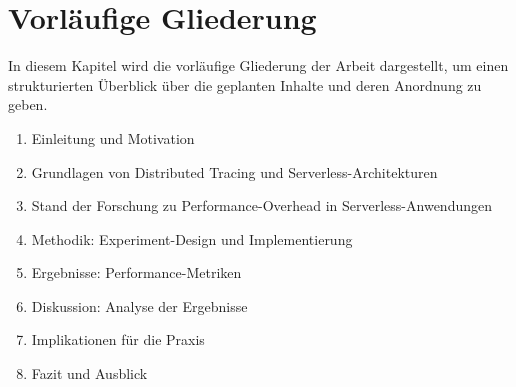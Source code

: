 \chapter{Vorläufige Gliederung}
\label{ch:chapter09}
In diesem Kapitel wird die vorläufige Gliederung der Arbeit dargestellt, um einen strukturierten Überblick über die geplanten Inhalte und deren Anordnung zu geben.
\begin{enumerate}
    \item Einleitung und Motivation
    \item Grundlagen von Distributed Tracing und Serverless-Architekturen
    \item Stand der Forschung zu Performance-Overhead in Serverless-Anwendungen
    \item Methodik: Experiment-Design und Implementierung
    \item Ergebnisse: Performance-Metriken 
    \item Diskussion: Analyse der Ergebnisse
    \item Implikationen für die Praxis
    \item Fazit und Ausblick
\end{enumerate}